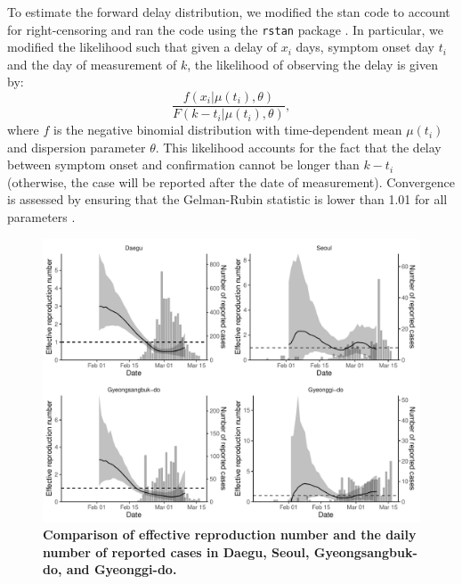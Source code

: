 \documentclass[12pt]{article}
\begin{document}
To estimate the forward delay distribution, we modified the stan code to account for right-censoring and ran the code using the \texttt{rstan} package \citep{rstan}.
In particular, we modified the likelihood such that given a delay of $x_i$ days, symptom onset day $t_i$ and the day of measurement of $k$, the likelihood of observing the delay is given by:
\begin{equation}
\frac{f(x_i|\mu(t_i), \theta)}{F(k-t_i|\mu(t_i), \theta)},
\end{equation}
where $f$ is the negative binomial distribution with time-dependent mean $\mu(t_i)$ and dispersion parameter $\theta$. This likelihood accounts for the fact that the delay between symptom onset and confirmation cannot be longer than $k-t_i$ (otherwise, the case will be reported after the date of measurement). Convergence is assessed by ensuring that the Gelman-Rubin statistic is lower than 1.01 for all parameters \citep{gelman1992inference}.

\pagebreak

\begin{figure}[!ht]
\includegraphics[width=\textwidth]{figure_R_t_all.pdf}
\caption{
\textbf{Comparison of effective reproduction number and the daily number of reported cases in Daegu, Seoul, Gyeongsangbuk-do, and Gyeonggi-do.}
}
\end{figure}

\pagebreak
\end{document}
